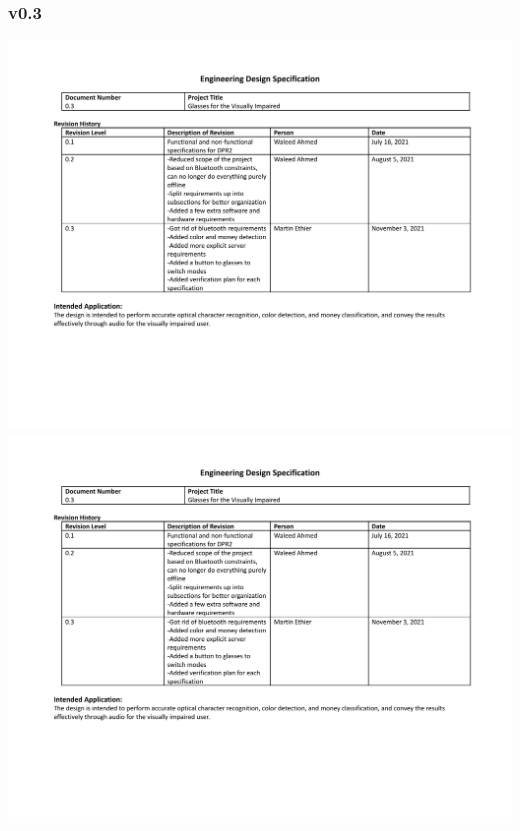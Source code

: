 \documentclass[a4paper,11pt]{article}
\begin{document}
\begin{landscape}
    \subsubsection{v0.3}
    \label{eds-0.3}
    \begin{center}
        \includegraphics[page=1,width={0.86\linewidth}]{pdf/eds_0.3.pdf}
        \newpage
        \includegraphics[page=2,width={0.86\linewidth}]{pdf/eds_0.3.pdf}
        \newpage

\end{center}
\end{landscape}
\end{document}
